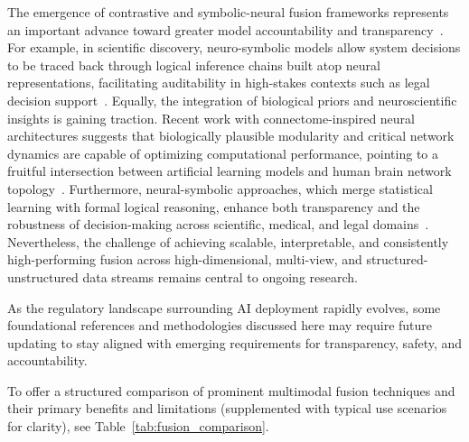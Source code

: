 \documentclass[sigconf]{acmart}
\begin{document}
The emergence of contrastive and symbolic-neural fusion frameworks represents an important advance toward greater model accountability and transparency~\cite{ref46,ref47,ref48,ref50,ref88}. For example, in scientific discovery, neuro-symbolic models allow system decisions to be traced back through logical inference chains built atop neural representations, facilitating auditability in high-stakes contexts such as legal decision support~\cite{ref46,ref49}. Equally, the integration of biological priors and neuroscientific insights is gaining traction. Recent work with connectome-inspired neural architectures suggests that biologically plausible modularity and critical network dynamics are capable of optimizing computational performance, pointing to a fruitful intersection between artificial learning models and human brain network topology~\cite{ref90}. Furthermore, neural-symbolic approaches, which merge statistical learning with formal logical reasoning, enhance both transparency and the robustness of decision-making across scientific, medical, and legal domains~\cite{ref46,ref47,ref48,ref49,ref50}. Nevertheless, the challenge of achieving scalable, interpretable, and consistently high-performing fusion across high-dimensional, multi-view, and structured-unstructured data streams remains central to ongoing research.

As the regulatory landscape surrounding AI deployment rapidly evolves, some foundational references and methodologies discussed here may require future updating to stay aligned with emerging requirements for transparency, safety, and accountability.

To offer a structured comparison of prominent multimodal fusion techniques and their primary benefits and limitations (supplemented with typical use scenarios for clarity), see Table~\ref{tab:fusion_comparison}.
\end{document}
